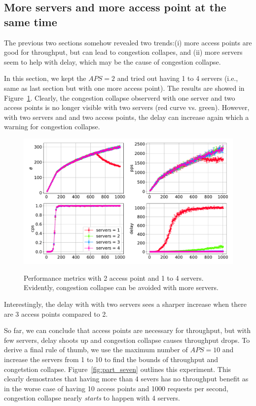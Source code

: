 \documentclass{report}
\begin{document}
\subsection{More servers and more access point at the same time}

The previous two sections somehow revealed two trends:(i) more access points
are good for throughput, but can lead to congestion collapes, and (ii) more
servers seem to help with delay, which may be the cause of congestion collapse.

In this section, we kept the $APS=2$ and tried out having 1 to 4 servers
(i.e., same as last section but with one more access point). The 
results are showed in Figure~\ref{fig:part_five}. Clearly, the congestion
collapse observerd with one server and two access points is no longer visible 
with two servers (red curve vs. green). However, with two servers and 
and two access points, the delay can increase again which a warning for 
congestion collapse.

\begin{figure}[h]
    \includegraphics[width=\linewidth]{../data/part_five.pdf}
    \label{fig:part_five}
    \caption{Performance metrics with 2 access point and 1 to 4 
    servers. Evidently, congestion collapse can be avoided with more 
    servers.}
\end{figure}

Interestingly, the delay with with two servers sees a sharper increase when 
there are 3 access points compared to 2.


So far, we can conclude that access points are necessary for throughput, but
with few servers, delay shoots up and congestion collapse causes throughput 
drops. To derive a final rule of thumb, we use the maximum number of 
$APS = 10$ and increase the servers from 1 to 10 to find the bounds of 
throughput and congetstion collapse. 
Figure~\ref{fig:part_seven} outlines this experiment. This clearly demostrates
that having more than 4 severs has no throughput benefit as in the worse case
of having 10 access points and 1000 requests per second, congestion collapse
nearly \emph{starts} to happen with 4 servers.
\end{document}
